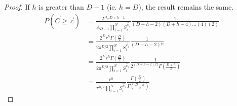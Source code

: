 \documentclass{article}
\begin{document}
\begin{proof}
	If $h$ is greater than $D-1$ (ie. $h=D$), the result remains the same.
	\begin{align}
		P(\vec{C}\ge \vec{c}) &= \frac{2^Dr^{D+h-1}}{A_{D-1}\prod_{i=1}^N S_i^{\vec{c}_i}}  \frac{1}{(D+h-2)(D+h-4)\hdots(4)(2)}  \\
		&= \frac{2^Dr^{h} \Gamma(\frac{D}{2})}{2 \pi^{D/2} \prod_{i=1}^N S_i^{\vec{c}_i}} \frac{1}{(D+h-2)!!} \\
		&= \frac{2^Dr^{h} \Gamma(\frac{D}{2})}{2 \pi^{D/2} \prod_{i=1}^N S_i^{\vec{c}_i}} \frac{1}{2^{(D+h-2)/2} \Gamma(\frac{D+h}{2})} \\
		&= \frac{r^{h}}{\pi^{h/2} \prod_{i=1}^N S_i^{\vec{c}_i}} \frac{\Gamma(\frac{D}{2})}{\Gamma(\frac{D+h}{2})} \label{eq:h crossings short}
	\end{align}
\end{proof}
\end{document}
